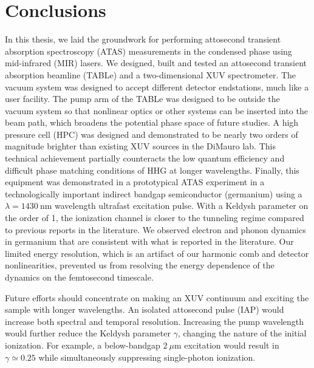 \chapter{Conclusions}
\label{chap:conclusions}

In this thesis, we laid the groundwork for performing attosecond transient absorption spectroscopy (ATAS) measurements in the condensed phase using mid-infrared (MIR) lasers. We designed, built and tested an attosecond transient absorption beamline (TABLe) and a two-dimensional XUV spectrometer. The vacuum system was designed to accept different detector endstations, much like a user facility. The pump arm of the TABLe was designed to be outside the vacuum system so that nonlinear optics or other systems can be inserted into the beam path, which broadens the potential phase space of future studies. A high pressure cell (HPC) was designed and demonstrated to be nearly two orders of magnitude brighter than existing XUV sources in the DiMauro lab. This technical achievement partially counteracts the low quantum efficiency and difficult phase matching conditions of HHG at longer wavelengths. Finally, this equipment was demonstrated in a prototypical ATAS experiment in a technologically important indirect bandgap semiconductor (germanium) using a ${\lambda = 1430 \ \textrm{nm}}$ wavelength ultrafast excitation pulse. With a Keldysh parameter on the order of 1, the ionization channel is closer to the tunneling regime compared to previous reports in the literature. We observed electron and phonon dynamics in germanium that are consistent with what is reported in the literature. Our limited energy resolution, which is an artifact of our harmonic comb and detector nonlinearities, prevented us from resolving the energy dependence of the dynamics on the femtosecond timescale.

Future efforts should concentrate on making an XUV continuum and exciting the sample with longer wavelengths. An isolated attosecond pulse (IAP) would increase both spectral and temporal resolution. Increasing the pump wavelength would further reduce the Keldysh parameter $\gamma$, changing the nature of the initial ionization. For example, a below-bandgap $2 \ \mu \textrm{m}$ excitation would result in $\gamma\simeq 0.25$ while simultaneously suppressing single-photon ionization.